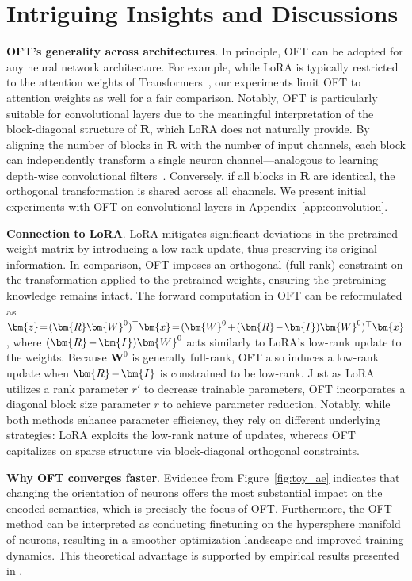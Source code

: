 \section{Intriguing Insights and Discussions}

\textbf{OFT’s generality across architectures}. In principle, OFT can be adopted for any neural network architecture. For example, while LoRA is typically restricted to the attention weights of Transformers~\cite{hulora2022}, our experiments limit OFT to attention weights as well for a fair comparison. Notably, OFT is particularly suitable for convolutional layers due to the meaningful interpretation of the block-diagonal structure of $\bm{R}$, which LoRA does not naturally provide. By aligning the number of blocks in $\bm{R}$ with the number of input channels, each block can independently transform a single neuron channel—analogous to learning depth-wise convolutional filters~\cite{chollet2017xception}. Conversely, if all blocks in $\bm{R}$ are identical, the orthogonal transformation is shared across all channels. We present initial experiments with OFT on convolutional layers in Appendix~\ref{app:convolution}.

\textbf{Connection to LoRA}. LoRA mitigates significant deviations in the pretrained weight matrix by introducing a low-rank update, thus preserving its original information. In comparison, OFT imposes an orthogonal (full-rank) constraint on the transformation applied to the pretrained weights, ensuring the pretraining knowledge remains intact. The forward computation in OFT can be reformulated as $\thickmuskip=2mu \medmuskip=2mu \bm{z}=(\bm{R}\bm{W}^0)^\top\bm{x}=(\bm{W}^0+(\bm{R}-\bm{I})\bm{W}^0)^\top\bm{x}$, where $\thickmuskip=2mu \medmuskip=2mu (\bm{R}-\bm{I})\bm{W}^0$ acts similarly to LoRA's low-rank update to the weights. Because $\bm{W}^0$ is generally full-rank, OFT also induces a low-rank update when $\thickmuskip=2mu \medmuskip=2mu \bm{R}-\bm{I}$ is constrained to be low-rank. Just as LoRA utilizes a rank parameter $r'$ to decrease trainable parameters, OFT incorporates a diagonal block size parameter $r$ to achieve parameter reduction. Notably, while both methods enhance parameter efficiency, they rely on different underlying strategies: LoRA exploits the low-rank nature of updates, whereas OFT capitalizes on sparse structure via block-diagonal orthogonal constraints.

\textbf{Why OFT converges faster}. Evidence from Figure~\ref{fig:toy_ae} indicates that changing the orientation of neurons offers the most substantial impact on the encoded semantics, which is precisely the focus of OFT. Furthermore, the OFT method can be interpreted as conducting finetuning on the hypersphere manifold of neurons, resulting in a smoother optimization landscape and improved training dynamics. This theoretical advantage is supported by empirical results presented in \cite{liu2021orthogonal}.

